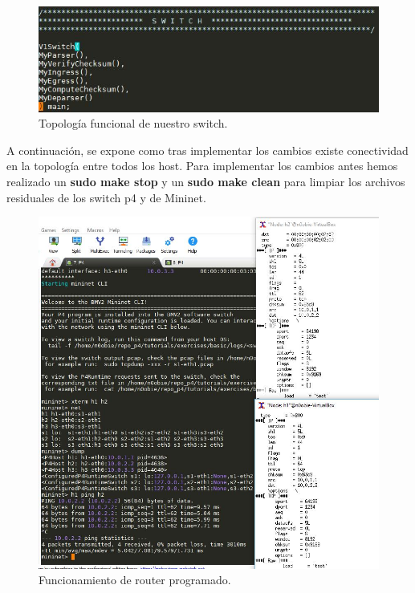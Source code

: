 \newline
\newline
\begin{figure}[!htb]
  \centering
    \includegraphics[width=0.8\linewidth]{./img/test/6.JPG}
    \caption{Topología funcional de nuestro switch.}
  \label{fig:yo}
\end{figure}
\newpage
A continuación, se expone como tras implementar los cambios existe conectividad en la topología entre todos los host. Para implementar los cambios antes hemos realizado un \textbf{sudo make stop} y un \textbf{sudo make clean} para limpiar los archivos residuales de los switch p4 y de Mininet.
\begin{figure}[!htb]
  \centering
    \includegraphics[width=\linewidth]{./img/test/7.JPG}
    \caption{Funcionamiento de router programado.}
  \label{fig:yo}
\end{figure}
\newpage
